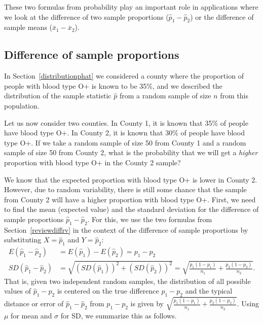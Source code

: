 These two formulas from probability play an important role in
applications where we look at the difference of two sample
proportions ($\hat{p}_1 - \hat{p}_2$) or the difference of
sample means ($\bar{x}_1 - \bar{x}_2$).


\subsection{Difference of sample proportions}
\label{distributionofdifference_diff_samp_props}

In Section~\ref{distributionphat} we considered a county where the proportion of people with blood type O+ is known to be 35\%, and we described the distribution of the sample statistic $\hat{p}$ from a random sample of size $n$ from this population.

Let us now consider two counties.  In County 1, it is known that 35\% of people have blood type O+.  In County 2, it is known that 30\% of people have blood type O+.  If we take a random sample of size 50 from County 1 and a random sample of size 50 from County 2, what is the probability that we will get a \emph{higher} proportion with blood type O+ in the County 2 sample?

We know that the expected proportion with blood type O+ is lower in County 2.  However, due to random variability, there is still some chance that the sample from County 2 will have a higher proportion with blood type O+.  First, we need to find the mean (expected value) and the standard deviation for the difference of sample proportions $\hat{p}_1 - \hat{p}_2$. For this, we use the two formulas from Section~\ref{reviewdiffrv} in the context of the difference of sample proportions by substituting $X = \hat{p}_1$ and $Y = \hat{p}_2$:
\begin{align*}
E(\hat{p}_1 - \hat{p}_2) &= E(\hat{p}_1) - E(\hat{p}_2) = p_1 - p_2 \\
SD(\hat{p}_1 - \hat{p}_2) &=  \sqrt{(SD(\hat{p}_1))^2 + (SD(\hat{p}_2))^2}=  \sqrt{\frac{p_1(1-p_1)}{n_1} + \frac{p_2(1-p_2)}{n_2}}.
\end{align*}
That is, given two independent random samples, the distribution of all possible values of $\hat{p}_1 - \hat{p}_2$ is centered on the true difference $p_1-p_2$ and the typical distance or error of $\hat{p}_1 - \hat{p}_2$ from $p_1-p_2$ is given by $\sqrt{\frac{p_1(1-p_1)}{n_1} + \frac{p_2(1-p_2)}{n_2}}$.
Using $\mu$ for mean and $\sigma$ for SD, we summarize this as follows.

